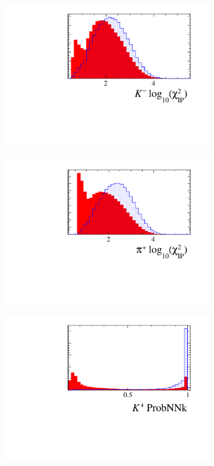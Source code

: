\begin{figure}[!h]
\begin{subfigure}[t]{0.22\textwidth}
      \includegraphics[width=1.0\textwidth]{figs/Selection/Ds_BDT_Var_Ds2KKPi_log10_D_K1_IPCHI2_OWNPV.pdf}
   \end{subfigure}
   \begin{subfigure}[t]{0.22\textwidth}
      \centering
      \includegraphics[width=1.0\textwidth]{figs/Selection/Ds_BDT_Var_Ds2KKPi_log10_D_P_IPCHI2_OWNPV.pdf}
   \end{subfigure}
   \begin{subfigure}[t]{0.22\textwidth}
      \centering
      \includegraphics[width=1.0\textwidth]{figs/Selection/Ds_BDT_Var_Ds2KKPi_D_K0_MC15TuneV1_ProbNNk.pdf}

\end{subfigure}
\end{figure}
